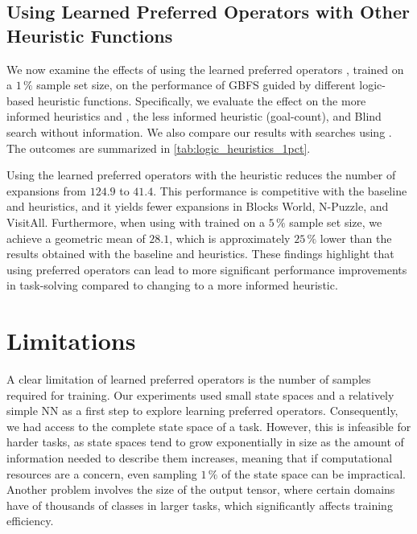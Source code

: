 \documentclass[ppgc,diss,english]{iiufrgs}
\begin{document}



\section{Using Learned Preferred Operators with Other Heuristic Functions}
\label{sec:other-heuristic-functions}
We now examine the effects of using the learned preferred operators \pog, trained on a $1\,\%$ sample set size, on the performance of GBFS guided by different logic-based heuristic functions. Specifically, we evaluate the effect on the more informed heuristics \hff and \hadd, the less informed heuristic \hgc (goal-count), and Blind search without information. We also compare our results with searches using \poff. The outcomes are summarized in \cref{tab:logic_heuristics_1pct}.



Using the learned preferred operators \pog with the \hgc heuristic reduces the number of expansions from $124.9$ to $41.4$. This performance is competitive with the baseline \hff and \hadd heuristics, and it yields fewer expansions in Blocks World, N-Puzzle, and VisitAll. Furthermore, when using \hgc with \pog trained on a $5\,\%$ sample set size, we achieve a geometric mean of $28.1$, which is approximately $25\,\%$ lower than the results obtained with the baseline \hff and \hadd heuristics. These findings highlight that using preferred operators can lead to more significant performance improvements in task-solving compared to changing to a more informed heuristic.


\chapter{Limitations}
\label{cha:limitations}
A clear limitation of learned preferred operators is the number of samples required for training. Our experiments used small state spaces and a relatively simple NN as a first step to explore learning preferred operators. Consequently, we had access to the complete state space of a task. However, this is infeasible for harder tasks, as state spaces tend to grow exponentially in size as the amount of information needed to describe them increases, meaning that if computational resources are a concern, even sampling $1\,\%$ of the state space can be impractical. Another problem involves the size of the output tensor, where certain domains have of thousands of classes in larger tasks, which significantly affects training efficiency.
\end{document}
